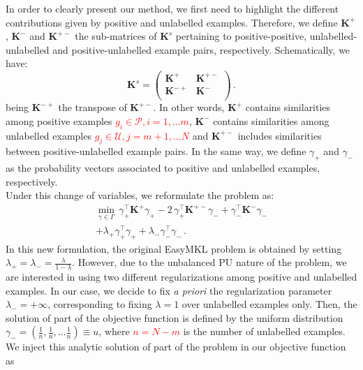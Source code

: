 \documentclass[twocolumn]{bmcart}%
\begin{document}
In order to clearly present our method, we first need to highlight the different contributions given by positive and unlabelled examples. Therefore, we define $\textbf{K}^{+}$, $\textbf{K}^{-}$ and $\textbf{K}^{+-}$ the sub-matrices of $\textbf{K}^s$ pertaining to positive-positive, unlabelled-unlabelled and positive-unlabelled example pairs, respectively. Schematically, we have:
\begin{equation*}
\textbf{K}^{s} = \left( \begin{array}{cc}
\textbf{K}^{+} & \textbf{K}^{+-}\\
\textbf{K}^{-+} & \textbf{K}^{-}\\
\end{array} \right) \, .
\end{equation*}
being $\textbf{K}^{-+}$ the transpose of $\textbf{K}^{+-}$. In other words, $\textbf{K}^{+}$ contains similarities among positive examples \textcolor{red}{$g_i \in \mathcal{P}, i = 1, \dots m$}, $\textbf{K}^{-}$ contains similarities among unlabelled examples \textcolor{red}{$g_j \in \mathcal{U}, j = m+1, \dots N$} and $\textbf{K}^{+-}$ includes similarities between positive-unlabelled example pairs. In the same way, we define $\gamma_{+}$ and $\gamma_{-}$ as the probability vectors associated to positive and unlabelled examples, respectively.\\
Under this change of variables, we reformulate the problem as:
\begin{multline*}
	\min \limits_{\gamma \in \Gamma} \, \gamma_{+}^{\top} \textbf{K}^{+} \gamma_{+} - 2 \,\gamma_{+}^{\top} \textbf{K}^{+-} \gamma_{-} +  \gamma_{-}^{\top} \textbf{K}^{-} \gamma_{-} \\+ \lambda_{+} \gamma_{+}^{\top} \gamma_{+} + \lambda_{-} \gamma_{-}^{\top} \gamma_{-} \, .
\end{multline*}
In this new formulation, the original EasyMKL problem is obtained by setting $\lambda_+ = \lambda_- = \frac{\lambda}{1-\lambda}$. However, due to the unbalanced PU nature of the problem, we are interested in using two different regularizations among positive and unlabelled examples. In our case, we decide to fix \emph{a priori} the regularization parameter  $\lambda_{-} = +\infty$, corresponding to fixing $\lambda=1$ over unlabelled examples only. Then, the solution of part of the objective function is defined by the uniform distribution $\gamma_{-} = (\frac{1}{n},\frac{1}{n},\dots\frac{1}{n}) \equiv u$, where \textcolor{red}{$n=N-m$} is the number of unlabelled examples.\\
We inject this analytic solution of part of the problem in our objective function as
\end{document}
